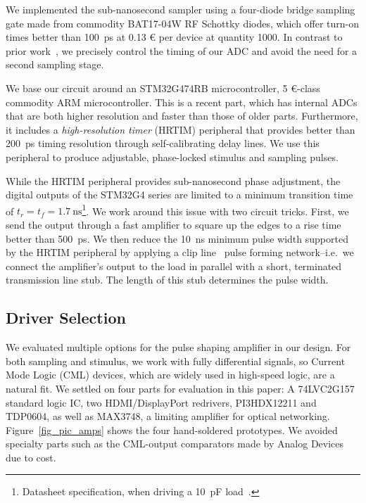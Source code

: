 \documentclass[final]{iacrtrans}
\newcommand{\partno}[1]{\textsf{\small#1}}
\newcommand{\price}[2]{#1 #2}
\begin{document}
We implemented the sub-nanosecond sampler using a four-diode bridge sampling gate made from commodity \partno{BAT17-04W}
RF Schottky diodes, which offer turn-on times better than \qty{100}{\pico\second} at \price{0.13}{\euro} per device at
quantity 1000. In contrast to prior
work~\cite{polasekReflektometrCasoveOblasti2020,houtman1GHzSamplingOscilloscope2000}, we precisely control the timing of
our ADC and avoid the need for a second sampling stage.

We base our circuit around an \partno{STM32G474RB} microcontroller, \price{5}{\euro}-class commodity ARM
microcontroller. This is a recent part, which has internal ADCs that are both higher resolution and faster than those of
older parts. Furthermore, it includes a \emph{high-resolution timer} (\partno{HRTIM}) peripheral that provides better
than \qty{200}{\pico\second} timing resolution through self-calibrating delay lines. We use this peripheral to produce
adjustable, phase-locked stimulus and sampling pulses.

While the HRTIM peripheral provides sub-nanosecond phase adjustment, the digital outputs of the \partno{STM32G4} series
are limited to a minimum transition time of $t_r=t_f=\qty{1.7}{\nano\second}$\footnote{Datasheet specification, when
driving a \qty{10}{\pico\farad} load~\cite{stmicroelectronicsSTM32G474xBDatasheet2021}.}. We work around this issue with
two circuit tricks. First, we send the output through a fast amplifier to square up the edges to a rise time better than
\qty{500}{\pico\second}. We then reduce the \qty{10}{\nano\second} minimum pulse width supported by the \partno{HRTIM}
peripheral by applying a clip line~\cite{tektronixinc.TektronixS6Sampling1982} pulse forming network--i.e.\ we connect
the amplifier's output to the load in parallel with a short, terminated transmission line stub. The length of this stub
determines the pulse width.

\subsection{Driver Selection}

We evaluated multiple options for the pulse shaping amplifier in our design. For both sampling and stimulus, we work
with fully differential signals, so Current Mode Logic (CML) devices, which are widely used in high-speed logic, are a
natural fit. We settled on four parts for evaluation in this paper: A \partno{74LVC2G157} standard logic IC, two
HDMI/DisplayPort redrivers, \partno{PI3HDX12211} and \partno{TDP0604}, as well as \partno{MAX3748}, a limiting amplifier
for optical networking. Figure\ \ref{fig_pic_amps} shows the four hand-soldered prototypes. We avoided specialty parts
such as the CML-output comparators made by Analog Devices due to cost.
\end{document}
